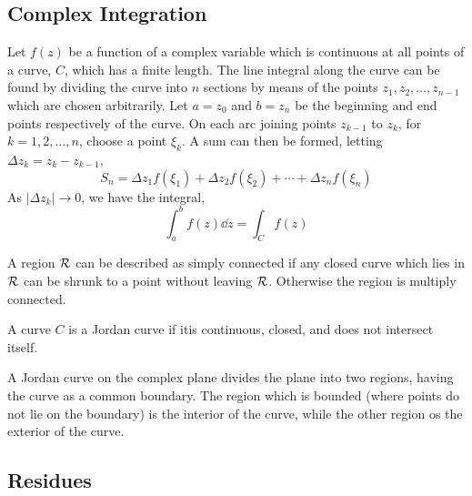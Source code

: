 \subsection{Complex Integration}
\label{sec:complexint}

\begin{definition}
  Let $f(z)$ be a function of a complex variable which is continuous
  at all points of a curve, $C$, which has a finite length. The line
  integral along the curve can be found by dividing the curve into $n$
  sections by means of the points $z_1, z_2, \dots, z_{n-1}$ which are
  chosen arbitrarily. Let $a = z_0$ and $b=z_n$ be the beginning and
  end points respectively of the curve. On each arc joining points
  $z_{k-1}$ to $z_k$, for $k = 1, 2, \dots, n$, choose a point
  $\xi_k$. A sum can then be formed, letting $\Delta z_k = z_k - z_{k-1}$,
  \[S_n = \Delta z_1 f(\xi_1) + \Delta z_2 f(\xi_2) + \cdots + \Delta
  z_n f(\xi_n) \] As $|\Delta z_k| \to 0$, we have the integral,
  \[ \int_a^b f(z) \dd{z} = \int_C f(z) \]
\end{definition}

\begin{definition}
  A region ${\cal R}$ can be described as simply connected if any
  closed curve which lies in ${\cal R}$ can be shrunk to a point
  without leaving ${\cal R}$. Otherwise the region is multiply
  connected.
\end{definition}

\begin{definition}
  A curve $C$ is a Jordan curve if itis continuous, closed, and does
  not intersect itself.
\end{definition}

\begin{theorem}
  A Jordan curve on the complex plane divides the plane into two
  regions, having the curve as a common boundary.  The region which is
  bounded (where points do not lie on the boundary) is the interior of
  the curve, while the other region os the exterior of the curve.
\end{theorem}


\subsection{Residues}
\label{sec:residues}


%

